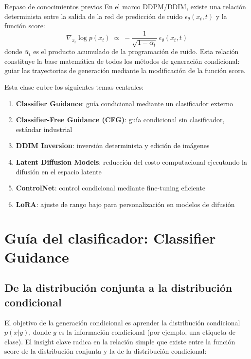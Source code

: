 \documentclass[a4paper]{article}
\begin{document}
\begin{knowledgebox}{Repaso de conocimientos previos}
En el marco DDPM/DDIM, existe una relación determinista entre la salida de la red de predicción de ruido $\epsilon_\theta(x_t, t)$ y la función score:
$$
\nabla_{x_t} \log p(x_t) \;\propto\; -\frac{1}{\sqrt{1-\bar\alpha_t}}\,\epsilon_\theta(x_t, t)
$$
donde $\bar\alpha_t$ es el producto acumulado de la programación de ruido. Esta relación constituye la base matemática de todos los métodos de generación condicional: guiar las trayectorias de generación mediante la modificación de la función score.
\end{knowledgebox}

Esta clase cubre los siguientes temas centrales:
\begin{enumerate}
    \item \textbf{Classifier Guidance}: guía condicional mediante un clasificador externo
    \item \textbf{Classifier-Free Guidance (CFG)}: guía condicional sin clasificador, estándar industrial
    \item \textbf{DDIM Inversion}: inversión determinista y edición de imágenes
    \item \textbf{Latent Diffusion Models}: reducción del costo computacional ejecutando la difusión en el espacio latente
    \item \textbf{ControlNet}: control condicional mediante fine-tuning eficiente
    \item \textbf{LoRA}: ajuste de rango bajo para personalización en modelos de difusión
\end{enumerate}

\newpage

\section{Guía del clasificador: Classifier Guidance}

\subsection{De la distribución conjunta a la distribución condicional}

El objetivo de la generación condicional es aprender la distribución condicional $p(x|y)$, donde $y$ es la información condicional (por ejemplo, una etiqueta de clase). El insight clave radica en la relación simple que existe entre la función score de la distribución conjunta y la de la distribución condicional:
\end{document}
